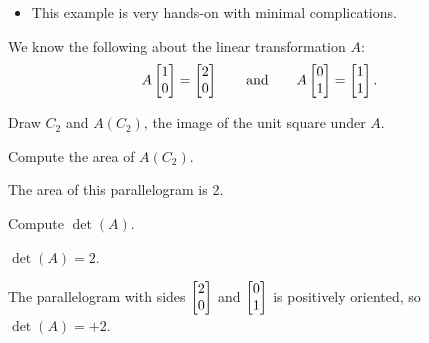 \documentclass{workbook}
\begin{document}
\begin{slide}
\begin{annotation}
		\begin{notes}
			\begin{itemize}
				\item This example is very hands-on with minimal complications.
			\end{itemize}
		\end{notes}
	\end{annotation}
	We know the following about the linear transformation $A$:
	\[
		A\mat{1\\0}=\mat{2\\0}\qquad\text{and}\qquad A\mat{0\\1}=\mat{1\\1}.
	\]
	\begin{parts}
		\item Draw $C_2$ and $A(C_2)$, the image of the unit square
			under $A$.
			\begin{solution}
			\end{solution}
		\item Compute the area of $A(C_2)$.
			\begin{solution}[inline]
				The area of this parallelogram is 2.
			\end{solution}
		\item Compute $\det(A)$.
			\begin{solution}
				$\det(A)=2$.

				The parallelogram with sides $\mat{2\\0}$ and $\mat{0\\1}$ is
				positively oriented, so $\det(A)=+2$.
			\end{solution}
	\end{parts}

	\begin{bookonly}\end{bookonly}


\end{slide}
\end{document}
